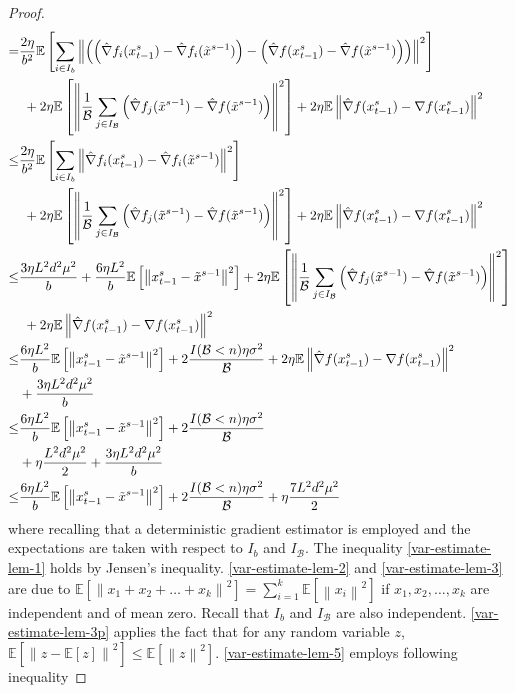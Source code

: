 \documentclass[iicol,sn-basic]{sn-jnl}
\theoremstyle{thmstyleone}%
\theoremstyle{thmstyletwo}%
\theoremstyle{thmstylethree}%
\newcommand*{\E}{\mathbb{E}}
\newcommand{\norm}[1]{\left\lVert#1\right\rVert}
\begin{document}
\begin{proof}
\begin{align}
   = &\notag\frac{2\eta}{b^2}\E\left[\sum_{i\in I_b}\norm{\left(\left(\hat{\nabla} f_i(x_{t-1}^s)-\hat{\nabla} f_i(\tilde{x}^{s-1})\right) - \left({\hat{\nabla}} f(x_{t-1}^s) - \hat{\nabla} f(\tilde{x}^{s-1}) \right)\right)}^2\right]\\
   &\,\, \label{var-estimate-lem-3}+ 2\eta \E \left[ \norm{\frac{1}{\mathcal{B}}\sum_{j\in I_{\mathcal{B}}}\left(\hat{\nabla} f_j(\tilde{x}^{s-1}) - \hat{\nabla} f(\tilde{x}^{s-1})\right)}^2\right]+2\eta \E \norm{\hat{\nabla} f(x_{t-1}^s)-\nabla f(x_{t-1}^s)}^2\\
   \leq &\notag\frac{2\eta}{b^2}\E\left[\sum_{i\in I_b}\norm{\hat{\nabla} f_i(x_{t-1}^s)-\hat{\nabla} f_i(\tilde{x}^{s-1}) }^2\right]\\
   &\,\, \label{var-estimate-lem-3p}+ 2\eta \E \left[ \norm{\frac{1}{\mathcal{B}}\sum_{j\in I_{\mathcal{B}}}\left(\hat{\nabla} f_j(\tilde{x}^{s-1}) - \hat{\nabla} f(\tilde{x}^{s-1})\right)}^2\right]+2\eta \E \norm{\hat{\nabla} f(x_{t-1}^s)-\nabla f(x_{t-1}^s)}^2\\
   \leq  &\frac{3 \eta L^2 d^2 \mu^2}{b} + \frac{6\eta L^2}{b}\E\left[\norm{x_{t-1}^s-\tilde{x}^{s-1}}^2\right]+ 2\eta \E \left[ \norm{\frac{1}{\mathcal{B}}\sum_{j\in I_{\mathcal{B}}}\left(\hat{\nabla} f_j(\tilde{x}^{s-1}) - \hat{\nabla} f(\tilde{x}^{s-1})\right)}^2\right]\notag\\
   &\,\,\label{var-estimate-lem-5}+2\eta \E \norm{\hat{\nabla} f(x_{t-1}^s)-\nabla f(x_{t-1}^s)}^2\\
   \leq  &\frac{6\eta L^2}{b}\E\left[\norm{x_{t-1}^s-\tilde{x}^{s-1}}^2\right]+ 2\frac{I(\mathcal{B} < n)\eta \sigma ^2}{\mathcal{B}}+2\eta \E \norm{\hat{\nabla} f(x_{t-1}^s)-\nabla f(x_{t-1}^s)}^2\notag\\
   & \label{var-estimate-lem-6}+ \frac{3 \eta L^2 d^2 \mu^2}{b}\\
   \leq  &\label{var-estimate-lem-7}\frac{6\eta L^2}{b}\E\left[\norm{x_{t-1}^s-\tilde{x}^{s-1}}^2\right]+ 2\frac{I(\mathcal{B} < n)\eta \sigma ^2}{\mathcal{B}}\notag\\
   & +\eta \frac{L^2d^2\mu^2}{2}+ \frac{3 \eta L^2 d^2 \mu^2}{b}\\
   \leq  &\frac{6\eta L^2}{b}\E\left[\norm{x_{t-1}^s-\tilde{x}^{s-1}}^2\right]+ 2\frac{I(\mathcal{B} < n)\eta \sigma ^2}{\mathcal{B}}+\eta \frac{7L^2 d^2 \mu^2}{2} 
 \end{align}
 where recalling that a deterministic gradient estimator is employed and the expectations are taken with respect to $I_b$ and $I_{\mathcal{B}}$. The inequality \eqref{var-estimate-lem-1} holds by Jensen’s inequality. \eqref{var-estimate-lem-2} and \eqref{var-estimate-lem-3} are due to $\E[\norm{x_1+x_2+\ldots+x_k}^2] = \sum_{i=1}^k \E[\norm{x_i}^2]$ if $x_1,x_2,\ldots,x_k$ are independent and of mean zero. Recall that $I_b$ and $I_{\mathcal{B}}$ are also independent. \eqref{var-estimate-lem-3p} applies the fact that for any random variable $z$, $\E[\norm{z-\E[z]}^2] \leq \E[\norm{z}^2]$. \eqref{var-estimate-lem-5} employs following inequality  

\end{proof}
\end{document}
